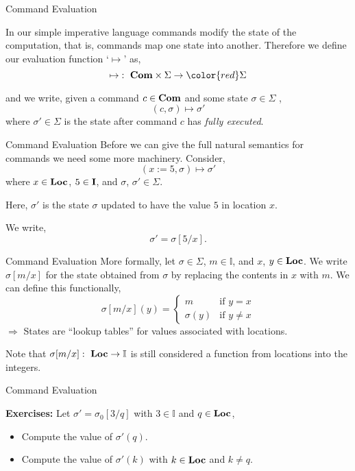 \documentclass{beamer}
\begin{document}
\begin{frame}{Command Evaluation}

In our simple imperative language commands modify the state of the computation, that is,
commands map one state into another.  Therefore we define
our evaluation function `$\mapsto$' as,
\[
\mapsto \co \syntaxset{Com} \times \Sigma\rightarrow {\color{red}\Sigma}
\]

and we write, given a command $c \in \mbox{\bf Com}$ and some state $\sigma \in \Sigma$ ,
\[
( c, \sigma ) \mapsto \sigma'
\]
where $\sigma' \in \Sigma$ is the state after command $c$ has {\em fully executed}.
\end{frame}

\begin{frame}{Command Evaluation}
Before we can give the full natural semantics for commands we need some more
machinery.  Consider,
\[
( x := 5, \sigma ) \mapsto \sigma'
\]
where $x \in \mbox{\bf Loc}$, $5 \in \mbox{\bf I}$, and $\sigma$, $\sigma' \in \Sigma$.

\vspace{.1in}

Here, $\sigma'$ is the state $\sigma$ updated to have the value $5$ in location $x$. 

We write,
\[
\sigma' = \sigma[5/x].
\]

\end{frame}

\begin{frame}{Command Evaluation}
More formally, let $\sigma \in \Sigma$, $m \in \mathbb{I}$, and $x$, $y \in \mbox{\bf Loc}$.  We write $\sigma[m/x]$ for the state obtained from $\sigma$ by
replacing the contents in $x$ with $m$.  We can define this functionally,
\[
\sigma[m/x](y) = \left\{
	\begin{array}{ll}
	m & \mbox{if $y = x$}\\
	\sigma(y) & \mbox{if $y \ne x$}
	\end{array}
	\right .
\]
$\Rightarrow$ States are ``lookup tables'' for values associated with locations.

\vspace{.1in}

Note that $\sigma[m/x]\,\colon\; \mbox{\bf Loc} \rightarrow \mathbb{I}$ is still considered a function
from locations into the integers.

\end{frame}

\begin{frame}{Command Evaluation}

{\bf Exercises:} Let $\sigma' = \sigma_0[3/q]$ with $3\in \mathbb{I}$ and $q\in \mbox{\bf Loc}$,
\begin{itemize}
\item Compute the value of $\sigma'(q)$.
\item Compute the value of $\sigma'(k)$ with $k\in\mbox{\bf Loc}$ and $k \ne q$.
\end{itemize}
\end{frame}
\end{document}
